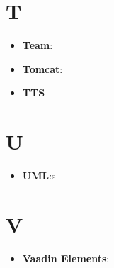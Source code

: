 \documentclass[a4paper, oneside, openany]{article}
\begin{document}
\section{T}
\begin{itemize}
\item \textbf{Team}:
\item \textbf{Tomcat}:
\item \textbf{TTS}
\end{itemize}

\section{U}
\begin{itemize}
\item \textbf{UML}:s
\end{itemize}

\section{V}
\begin{itemize}
\item \textbf{Vaadin Elements}:
\end{itemize}
\end{document}

